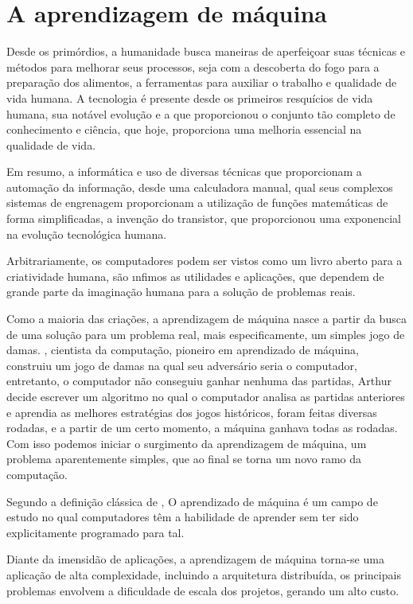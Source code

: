 
\chapter{\textbf{A aprendizagem de máquina}} %

Desde os primórdios, a humanidade busca maneiras de aperfeiçoar suas técnicas e métodos para melhorar seus processos, seja com a descoberta do fogo para a preparação dos alimentos, a ferramentas para auxiliar o trabalho e qualidade de vida humana. A tecnologia é presente desde os primeiros resquícios de vida humana, sua notável evolução e a que proporcionou o conjunto tão completo de conhecimento e ciência, que hoje, proporciona uma melhoria essencial na qualidade de vida.\par
Em resumo, a informática e uso de diversas técnicas que proporcionam a automação da informação, desde uma calculadora manual, qual seus complexos sistemas de engrenagem proporcionam a utilização de funções matemáticas de forma simplificadas, a invenção do transistor, que proporcionou uma exponencial na evolução tecnológica humana. \par
Arbitrariamente, os computadores podem ser vistos como um livro aberto para a criatividade humana, são ınfimos as utilidades e aplicações, que dependem de grande parte da imaginação humana para a solução de problemas reais. \par
Como a maioria das criações, a aprendizagem de máquina nasce a partir da busca de uma solução para um problema real, mais especificamente, um simples jogo de damas. \cite{Samuel1959}, cientista da computação, pioneiro em aprendizado de máquina,
construiu um jogo de damas na qual seu adversário seria o computador, entretanto, o computador não conseguiu ganhar nenhuma das partidas, Arthur decide escrever um algoritmo no qual o computador analisa as partidas anteriores e aprendia as melhores estratégias dos jogos históricos, foram feitas diversas rodadas, e a partir de um certo momento, a máquina ganhava todas as rodadas. Com isso podemos iniciar o surgimento da aprendizagem de máquina, um problema aparentemente simples, que ao final se torna um novo ramo da computação.\par 
Segundo a definição clássica de \cite{Samuel1959}, O aprendizado de máquina é um campo de estudo no qual computadores têm a habilidade de aprender sem ter sido explicitamente programado para tal. \par
Diante da imensidão de aplicações, a aprendizagem de máquina torna-se uma aplicação de alta complexidade, incluindo a arquitetura distribuída, os principais problemas envolvem a dificuldade de escala dos projetos, gerando um alto custo. 


